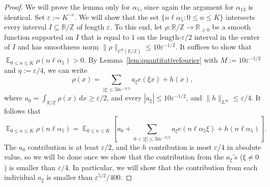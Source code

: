 \documentclass[11pt]{amsart}
\theoremstyle{definition}
\DeclareMathOperator*{\E}{\mathbb{E}}
\newcommand{\R}{{\mathbb R}}
\newcommand{\Z}{{\mathbb Z}}
\begin{document}
\begin{proof}
We will prove the lemma only for $\alpha_5$, since again the argument for $\alpha_{13}$ is identical.  Set $\varepsilon:=K^{-c}$.  We will show that the set $\{n\ell \alpha_5: 0 \leq n \leq K\}$ intersects every interval $I \subseteq \mathbb{R}/\mathbb{Z}$ of length $\varepsilon$.  To this end, let $\rho: \mathbb{R}/\mathbb{Z} \to \mathbb{R}_{\geq 0}$ be a smooth function supported on $I$ that is equal to $1$ on the length-$\varepsilon/2$ interval in the center of $I$ and has smoothness norm $\|\rho\|_{C^2(\R/\Z)} \leq 10 \varepsilon^{-1/2}$.  It suffices to show that $\E_{0 \leq n \leq K} \rho(n\ell \alpha_5)>0$.  By Lemma~\ref{lem:quantitativefourier} with $M:=10\varepsilon^{-1/2}$ and $\eta:=\varepsilon/4$, we can write
$$\rho(x) = \sum_{|\xi| \leq 50\varepsilon^{-3/2}} a_\xi e(\xi x) + h(x),$$
where $a_0 = \int_{\mathbb{R}/\mathbb{Z}} \rho(x) \,dx \geq \varepsilon/2$, and every $|a_\xi| \le 10 \varepsilon^{-1/2}$, and $\|h\|_{L^\infty} \le \varepsilon/4$.  It follows that
$$\E_{0 \leq n \leq K} \rho(n\ell \alpha_5)=\E_{0 \leq n \leq K} \left[a_0+\sum_{0<|\xi|\leq 50\varepsilon^{-3/2}}a_\xi e(n\ell \alpha_5 \xi)+h(n\ell \alpha_5)\right].$$
The $a_0$ contribution is at least $\varepsilon/2$, and the $h$ contribution is most $\varepsilon/4$ in absolute value, so we will be done once we show that the contribution from the $a_\xi$'s ($\xi \neq 0$) is smaller than $\varepsilon/4$.  In particular, we will show that the contribution from each individual $a_\xi$ is smaller than $\varepsilon^{5/2}/400$.


\end{proof}
\end{document}
